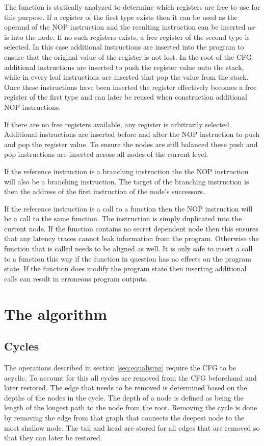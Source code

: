 The function is statically analyzed to determine which registers are free to use for this purpose. 
If a register of the first type exists then it can be used as the operand of the NOP instruction and the resulting instruction 
can be inserted as-is into the node. If no such registers exists, a free register of the second type is selected. 
In this case additional instructions are inserted into the program to ensure that the original value of the register is not lost. 
In the root of the CFG additional instructions are inserted to push the register value onto the stack, while in every leaf instructions are inserted 
that pop the value from the stack. Once these instructions have been inserted the register effectively becomes a free register of the first type and can 
later be reused when construction additional NOP instructions.

If there are no free registers available, any register is arbitrarily selected. Additional instructions are inserted before and after the NOP instruction to push and pop the register value. To ensure the nodes are 
still balanced these push and pop instructions are inserted across all nodes of the current level. 

If the reference instruction is a branching instruction the the NOP instruction will also be a branching instruction. The target of the branching instruction is then the address of the first instruction of the node's successors. 

If the reference instruction is a call to a function then the NOP instruction will be  a call to the same function. The instruction is simply duplicated into the current node. 
If the function contains no secret dependent node then this ensures that any latency traces cannot leak information from the program. Otherwise the function that is called needs to be aligned as well. 
It is only safe to insert a call to a function this way if the function in question has no effects on the program state. If the function does modify the program state then inserting additional calls can 
result in erroneous program outputs. 

\section{The algorithm}


\subsection{Cycles}
The operations described in section \ref{seq:equalising} require the CFG to be acyclic.
To account for this all cycles are removed from the CFG beforehand and later restored. 
The edge that needs to be removed is determined based on the depths of the nodes in the cycle. 
The depth of a node is defined as being the length of the longest path to the node from the root. 
Removing the cycle is done by removing the edge from that graph that connects the deepest node to the most shallow node. 
The tail and head are stored for all edges that are removed so that they can later be restored. 

